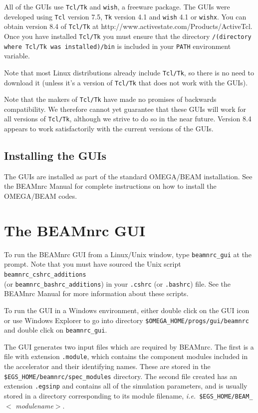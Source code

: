 \documentclass[12pt,twoside]{article}
\newcommand{\ie}{{\em i.e.}}
\begin{document}
All of the GUIs use {\tt Tcl/Tk} and {\tt wish}, a freeware package.
The GUIs were developed using {\tt Tcl} version 7.5, {\tt Tk} version
4.1 and {\tt wish} 4.1 or {\tt wishx}.  You
can obtain version 8.4 of {\tt Tcl/Tk} at
{http://www.activestate.com/Products/ActiveTcl}.
Once you have installed {\tt Tcl/Tk} you must ensure that the directory
{\tt /(directory where Tcl/Tk was installed)/bin} is included in your
{\tt PATH} environment variable.

Note that most Linux distributions already include {\tt Tcl/Tk}, so there
is no need to download it (unless it's a version of {\tt Tcl/Tk}
that does not work with the GUIs).

Note that the makers of {\tt Tcl/Tk} have made no promises of backwards
compatibility.  We therefore cannot yet guarantee that these GUIs will
work for all versions of {\tt Tcl/Tk}, although we strive to do so in
the near future.  Version 8.4 appears to work satisfactorily with the
current versions of the GUIs.

\subsection{Installing the GUIs}

The GUIs are installed as part of the standard OMEGA/BEAM installation.
See the BEAMnrc Manual\cite{Ro04a} for complete instructions on how to
install the OMEGA/BEAM codes.

\section{The BEAMnrc GUI}

To run the BEAMnrc GUI from a Linux/Unix window, type {\tt beamnrc\_gui} at
the prompt.  Note that you must have sourced the Unix script
{\tt beamnrc\_cshrc\_additions}\\(or {\tt beamnrc\_bashrc\_additions}) in
your {\tt .cshrc} (or {\tt .bashrc}) file.  See the BEAMnrc Manual\cite{Ro04a}
for more information about these scripts.

To run the GUI in a Windows environment, either double click on
the GUI icon or use Windows Explorer to go into directory
{\tt \$OMEGA\_HOME/progs/gui/beamnrc} and double click on
{\tt beamnrc\_gui}.

The GUI generates two input files which are required by BEAMnrc.  The first is a
file with extension {\tt .module}, which contains the component modules
included in the accelerator and their identifying names.  These are
stored in the {\tt \$EGS\_HOME/beamnrc/spec\_modules} directory.  The
second file created has an extension {\tt .egsinp} and contains all of the
simulation parameters, and is usually stored in a directory
corresponding to its module filename, \ie~{\tt \$EGS\_HOME/BEAM\_}$<${\em
modulename}$>$.
\end{document}
